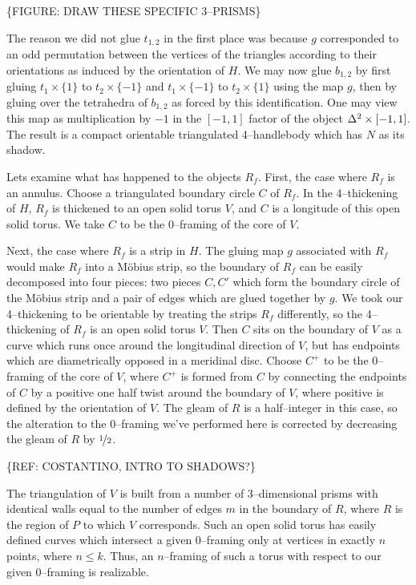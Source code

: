 \{FIGURE: DRAW THESE SPECIFIC 3--PRISMS\}

The reason we did not glue $t_{1,2}$ in the first place was because $g$ corresponded to an odd permutation between the vertices of the triangles according to their orientations as induced by the orientation of $H$.
We may now glue $b_{1,2}$ by first gluing $t_1\times\{1\}$ to $t_2\times\{- 1\}$ and $t_1\times\{- 1\}$ to $t_2\times\{ 1\}$ using the map $g$, then by gluing over the tetrahedra of $b_{1,2}$ as forced by this identification.
One may view this map as multiplication by $-1$ in the $[-1,1]$ factor of the object $\Delta^2\times[-1,1]$.
The result is a compact orientable triangulated 4--handlebody which has $N$ as its shadow.

Lets examine what has happened to the objects $R_f$.
First, the case where $R_f$ is an annulus.
Choose a triangulated boundary circle $C$ of $R_f$.
In the 4--thickening of $H$, $R_f$ is thickened to an open solid torus $V$, and $C$ is a longitude of this open solid torus.
We take $C$ to be the 0--framing of the core of $V$.

Next, the case where $R_f$ is a strip in $H$.
The gluing map $g$ associated with $R_f$ would make $R_f$ into a M\"obius strip, so the boundary of $R_f$ can be easily decomposed into four pieces: two pieces $C,C'$ which form the boundary circle of the M\"obius strip and a pair of edges which are glued together by $g$.
We took our 4--thickening to be orientable by treating the strips $R_f$ differently, so the 4--thickening of $R_f$ is an open solid torus $V$.
Then $C$ sits on the boundary of $V$ as a curve which runs once around the longitudinal direction of $V$, but has endpoints which are diametrically opposed in a meridinal disc.
Choose $C^+$ to be the 0--framing of the core of $V$, where $C^+$ is formed from $C$ by connecting the endpoints of $C$ by a positive one half twist around the boundary of $V$, where positive is defined by the orientation of $V$.
The gleam of $R$ is a half--integer in this case, so the alteration to the 0--framing we've performed here is corrected by decreasing the gleam of $R$ by $\nicefrac{1}{2}$.

\{REF: COSTANTINO, INTRO TO SHADOWS?\}

The triangulation of $V$ is built from a number of 3--dimensional prisms with identical walls equal to the number of edges $m$ in the boundary of $R$, where $R$ is the region of $P$ to which $V$ corresponds.
Such an open solid torus has easily defined curves which intersect a given 0--framing only at vertices in exactly $n$ points, where $n\leq k$.
Thus, an $n$--framing of such a torus with respect to our given 0--framing is realizable. 
